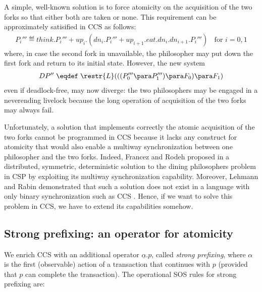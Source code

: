 A simple, well-known solution is to force atomicity on the acquisition of the two forks so that either both are taken or none. This requirement can be approximately satisified in CCS as follows:
\begin{eqnarray*}
P_i''' \eqdef think.P_i''' +  up_i.(dn_i.P_i''' + up_{i+1}.eat.dn_i.dn_{i+1}.P_i''')  \; \;  \mbox{   for  }i = 0, 1 
\end{eqnarray*}
where, in case the second fork in unavailable, the philosopher may put down the first fork and return to its initial state. 
However, the new system
\begin{eqnarray*}
DP'' \;  \eqdef \;  \restr{L}(((P_0'''\para P_1''') \para F_0) \para F_1) 
\end{eqnarray*}
even if deadlock-free, may now diverge: the two philosophers may be engaged in a neverending livelock because the long operation of acquisition of the two forks may always fail.


Unfortunately, a solution that implements correctly the atomic acquisition of the two forks cannot be programmed in CCS because it lacks any construct for atomicity that would also enable a multiway synchronization between one philosopher and the two forks. Indeed, Francez and Rodeh proposed in \cite{FR80} a distributed, symmetric, deterministic solution to the dining philosophers problem in CSP \cite{Hoa85} by exploiting its  multiway synchronization capability. Moreover, Lehmann and Rabin demonstrated that such a solution does not exist in a language with only binary synchronization such as CCS \cite{LR81}. Hence, if we want to solve this problem in CCS, we have to extend its capabilities somehow.

\subsection{Strong prefixing: an operator for atomicity}

We enrich CCS with an additional operator $\underline{\alpha}.p$, called {\em strong prefixing}, where $\alpha$ is the first (observable) action of a transaction that continues with $p$ (provided that $p$ can complete the transaction). The operational SOS rules for strong prefixing are:\\

